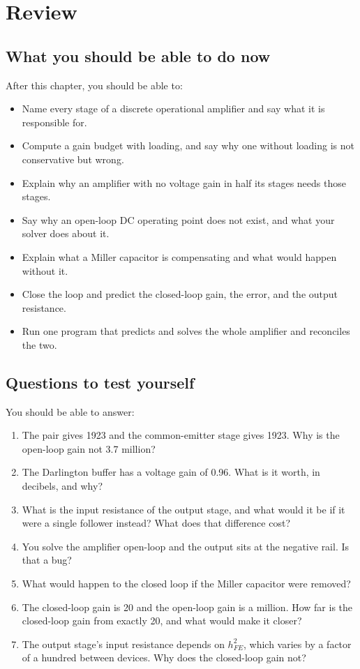 

\section{Review}
\label{c10:sec:review}

\subsection*{What you should be able to do now}
After this chapter, you should be able to:
\begin{itemize}
  \item Name every stage of a discrete operational amplifier and say what it is responsible for.
  \item Compute a gain budget with loading, and say why one without loading is not conservative but wrong.
  \item Explain why an amplifier with no voltage gain in half its stages needs those stages.
  \item Say why an open-loop DC operating point does not exist, and what your solver does about it.
  \item Explain what a Miller capacitor is compensating and what would happen without it.
  \item Close the loop and predict the closed-loop gain, the error, and the output resistance.
  \item Run one program that predicts and solves the whole amplifier and reconciles the two.
\end{itemize}

\subsection*{Questions to test yourself}
You should be able to answer:
\begin{enumerate}
  \item The pair gives 1923 and the common-emitter stage gives 1923. Why is the open-loop gain not 3.7 million?
  \item The Darlington buffer has a voltage gain of 0.96. What is it worth, in decibels, and why?
  \item What is the input resistance of the output stage, and what would it be if it were a single follower instead? What does that difference cost?
  \item You solve the amplifier open-loop and the output sits at the negative rail. Is that a bug?
  \item What would happen to the closed loop if the Miller capacitor were removed?
  \item The closed-loop gain is 20 and the open-loop gain is a million. How far is the closed-loop gain from exactly 20, and what would make it closer?
  \item The output stage's input resistance depends on $h_{FE}^2$, which varies by a factor of a hundred between devices. Why does the closed-loop gain not?
\end{enumerate}

